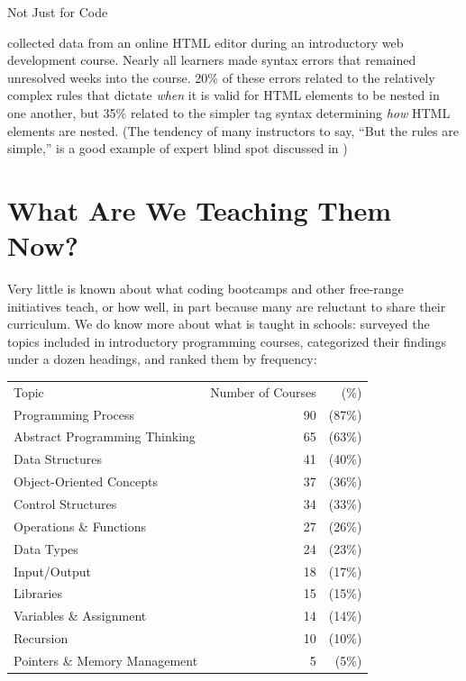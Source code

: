 \begin{callout}{Not Just for Code}

  \cite{Park2015} collected data from an online HTML editor during an
  introductory web development course.  Nearly all learners made
  syntax errors that remained unresolved weeks into the course.  20\%
  of these errors related to the relatively complex rules that dictate
  \emph{when} it is valid for HTML elements to be nested in one
  another, but 35\% related to the simpler tag syntax determining
  \emph{how} HTML elements are nested.  (The tendency of many
  instructors to say, ``But the rules are simple,'' is a good example
  of expert blind spot discussed in )

\end{callout}

\section{What Are We Teaching Them Now?}\label{s:pck-now}

Very little is known about what coding bootcamps and other free-range
initiatives teach, or how well, in part because many are reluctant to
share their curriculum.  We do know more about what is taught in
schools: \cite{Luxt2017} surveyed the topics included in introductory
programming courses, categorized their findings under a dozen
headings, and ranked them by frequency:

{\small
\begin{longtable}{lrr}
  Topic & Number of Courses & (\%) \\
  Programming Process & 90 & (87\%) \\
  Abstract Programming Thinking & 65 & (63\%) \\
  Data Structures & 41 & (40\%) \\
  Object-Oriented Concepts & 37 & (36\%) \\
  Control Structures & 34 & (33\%) \\
  Operations \& Functions & 27 & (26\%) \\
  Data Types & 24 & (23\%) \\
  Input/Output & 18 & (17\%) \\
  Libraries & 15 & (15\%) \\
  Variables \& Assignment & 14 & (14\%) \\
  Recursion & 10 & (10\%) \\
  Pointers \& Memory Management & 5 & (5\%) \\
\end{longtable}
}

